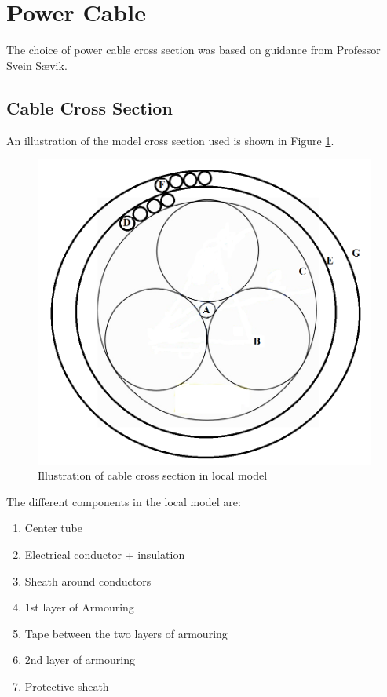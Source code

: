 \section{Power Cable}
The choice of power cable cross section was based on guidance from Professor Svein Sævik. 

\subsection{Cable Cross Section}
 An illustration of the model cross section used is shown in Figure \ref{fig:cross2}. 

\begin{figure}[H]
\centering
\includegraphics[scale=0.9]{figures/cross2}
\caption[$\; \:$Cable cross section in local model]{Illustration of cable cross section in local model  }
 \label{fig:cross2}
\end{figure}

\noindent The different components in the local model are:
\begin{enumerate}[label=\Alph*]
\item Center tube
\item Electrical conductor + insulation
\item Sheath around conductors
\item 1st layer of Armouring 
\item Tape between the two layers of armouring
\item 2nd layer of armouring
\item Protective sheath
\end{enumerate}

